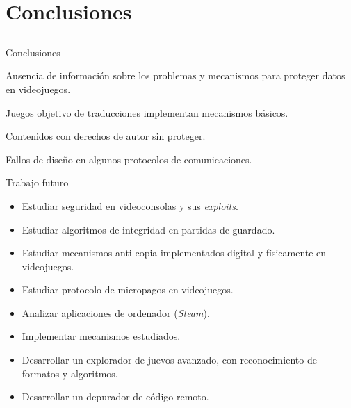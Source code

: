 
\section{Conclusiones}
\subsection{}

\begin{frame}{Conclusiones}
\begin{center}
Ausencia de información sobre los problemas y mecanismos para proteger datos en videojuegos.
\end{center}

\begin{wideitemize}
    \item<2-> Juegos objetivo de traducciones implementan mecanismos básicos.

    \item<3-> Contenidos con derechos de autor sin proteger.

    \item<4-> Fallos de diseño en algunos protocolos de comunicaciones.
\end{wideitemize}
\end{frame}

\begin{frame}{Trabajo futuro}
\begin{itemize}
    \item<+-> Estudiar seguridad en videoconsolas y sus \textit{exploits}.

    \item<+-> Estudiar algoritmos de integridad en partidas de guardado.

    \item<+-> Estudiar mecanismos anti-copia implementados digital y físicamente en videojuegos.

    \item<+-> Estudiar protocolo de micropagos en videojuegos.

    \item<+-> Analizar aplicaciones de ordenador (\textit{Steam}).

    \item<+-> Implementar mecanismos estudiados.

    \item<+-> Desarrollar un explorador de juevos avanzado, con reconocimiento de formatos y algoritmos.

    \item<+-> Desarrollar un depurador de código remoto.
\end{itemize}
\end{frame}
